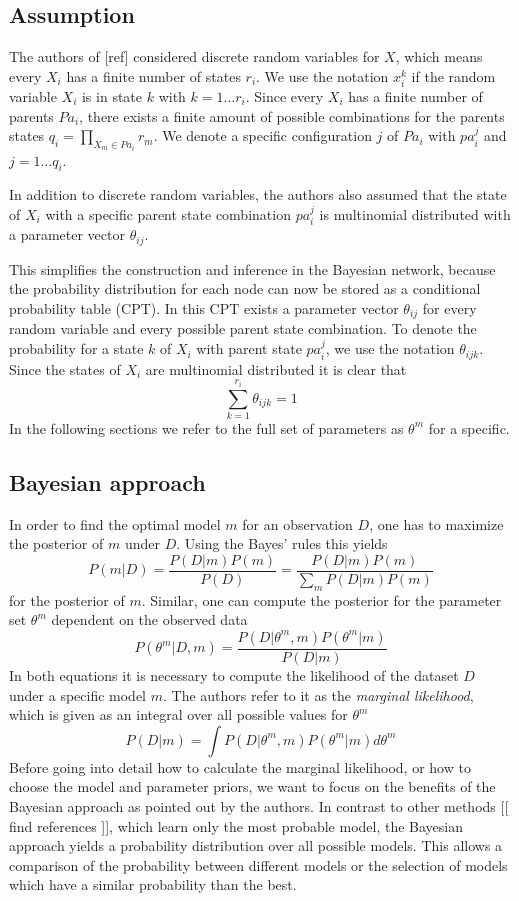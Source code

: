 \documentclass{article}
\begin{document}
	\subsection{Assumption}
	The authors of [ref] considered discrete random variables for $X$, which means	every $X_i$ has a
	finite number of	states $r_i$. We use the notation $x_i^k$ if the random variable $X_i$ is in state $k$
	with $k = 1...r_i$. Since every $X_i$ has a finite number of parents $Pa_i$, there exists
	a finite amount of possible combinations for the parents states $q_i=\prod_{X_m \in Pa_i} r_m$.
	We denote a specific configuration $j$ of $Pa_i$ with $pa_i^j$ and $j=1...q_i$. 
	
	In addition	to discrete random variables, the authors also assumed that the state of $X_i$ with a specific
	parent state combination $pa_i^j$ is multinomial distributed with a parameter vector $\theta_{ij}$.
	
	This simplifies the construction and inference in the Bayesian network,	because the probability
  distribution for each node can now be stored as a conditional probability table (CPT). In this CPT
	exists a parameter vector $\theta_{ij}$ for every random variable and every possible parent state
	combination. To denote the probability for a state $k$ of $X_i$ with parent state $pa_i^j$, we
	use the notation $\theta_{ijk}$. Since the states of $X_i$ are multinomial distributed it is clear
	that
	\[
		\sum_{k=1}^{r_i} \theta_{ijk} = 1
	\]
	In the following sections we refer to the full set of parameters as $\theta^m$ for a specific.	
	
	\subsection{Bayesian approach}
	In order to find the optimal model $m$ for an observation $D$, one has to maximize the posterior of $m$
	under $D$. Using the Bayes' rules this yields 
	\[
		P(m|D) = \frac{P(D|m)P(m)}{P(D)}=\frac{P(D|m)P(m)}{\sum_m P(D|m)P(m)}
	\]
	for the posterior of $m$. Similar, one can compute the posterior for the parameter set $\theta^m$ dependent
	on the observed data
	\[
		P(\theta^m|D,m)= \frac{P(D|\theta^m,m)P(\theta^m|m)}{P(D|m)}
	\]
	In both equations it is necessary to compute the likelihood of the dataset $D$ under a specific model $m$.
	The authors refer to it as the \textit{marginal likelihood}, which is given as an integral over all
	possible values for $\theta^m$
	\[
		P(D|m) = \int P(D|\theta^m,m)P(\theta^m|m) d\theta^m
	\]
	Before going into detail how to calculate the marginal likelihood, or how to choose the model and parameter
	priors, we want to focus on the benefits of the Bayesian approach as pointed out by the authors. In
	contrast to other methods [[ find references ]], which learn only the most probable model, the
	Bayesian approach yields a probability distribution over all possible models. This allows a 
	comparison of the probability between different models or the selection of models which have a similar
	probability than the best.
	
\end{document}
